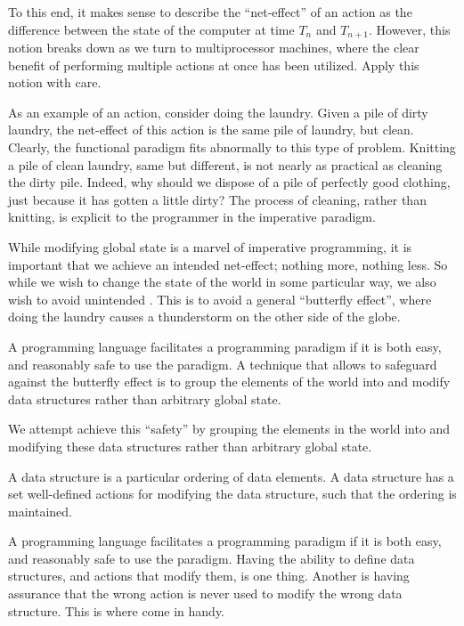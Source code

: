 To this end, it makes sense to describe the ``net-effect'' of an action as the
difference between the state of the computer at time $T_n$ and $T_{n+1}$.
However, this notion breaks down as we turn to multiprocessor machines, where
the clear benefit of performing multiple actions at once has been utilized.
Apply this notion with care.


As an example of an action, consider doing the laundry. Given a pile of dirty
laundry, the net-effect of this action is the same pile of laundry, but clean.
Clearly, the functional paradigm fits abnormally to this type of problem.
Knitting a pile of clean laundry, same but different, is not nearly as
practical as cleaning the dirty pile. Indeed, why should we dispose of a pile
of perfectly good clothing, just because it has gotten a little dirty? The
process of cleaning, rather than knitting, is explicit to the programmer in the
imperative paradigm.

While modifying global state is a marvel of imperative programming, it is
important that we achieve an intended net-effect; nothing more, nothing less.
So while we wish to change the state of the world in some particular way, we
also wish to avoid unintended .  This is to avoid a general
``butterfly effect'', where doing the laundry causes a thunderstorm on the
other side of the globe.

A programming language facilitates a programming paradigm if it is both easy,
and reasonably safe to use the paradigm. A technique that allows to safeguard
against the butterfly effect is to group the elements of the world into
 and modify data structures rather than arbitrary global
state.

We attempt achieve this
``safety'' by grouping the elements in the world into  and
modifying these data structures rather than arbitrary global state.

\begin{definition}

A data structure is a particular ordering of data elements. A data structure
has a set well-defined actions for modifying the data structure, such that the
ordering is maintained.

\end{definition}

A programming language facilitates a programming paradigm if it is both easy,
and reasonably safe to use the paradigm. Having the ability to define data
structures, and actions that modify them, is one thing.  Another is having
assurance that the wrong action is never used to modify the wrong data
structure. This is where  come in handy.

